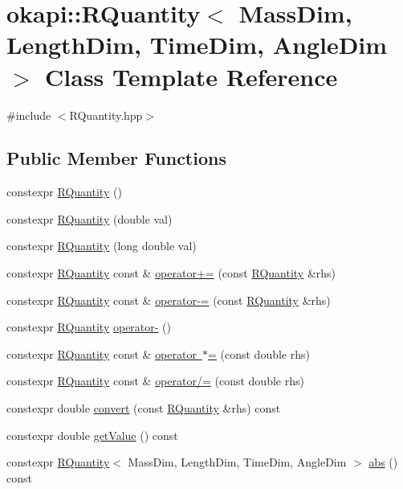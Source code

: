 \hypertarget{classokapi_1_1RQuantity}{}\section{okapi\+::R\+Quantity$<$ Mass\+Dim, Length\+Dim, Time\+Dim, Angle\+Dim $>$ Class Template Reference}
\label{classokapi_1_1RQuantity}


{\ttfamily \#include $<$R\+Quantity.\+hpp$>$}

\subsection*{Public Member Functions}
\begin{DoxyCompactItemize}
\item 
constexpr \mbox{\hyperlink{classokapi_1_1RQuantity_a0918777214e52b7ccb7fed21a822cdbe}{R\+Quantity}} ()
\item 
constexpr \mbox{\hyperlink{classokapi_1_1RQuantity_a94a20b6b52e5c85698de4fdd0a2b5336}{R\+Quantity}} (double val)
\item 
constexpr \mbox{\hyperlink{classokapi_1_1RQuantity_ab9101b75104aaa2a367781b4b0160c50}{R\+Quantity}} (long double val)
\item 
constexpr \mbox{\hyperlink{classokapi_1_1RQuantity}{R\+Quantity}} const  \& \mbox{\hyperlink{classokapi_1_1RQuantity_a788b594f6f9050612d781357bcfe745c}{operator+=}} (const \mbox{\hyperlink{classokapi_1_1RQuantity}{R\+Quantity}} \&rhs)
\item 
constexpr \mbox{\hyperlink{classokapi_1_1RQuantity}{R\+Quantity}} const  \& \mbox{\hyperlink{classokapi_1_1RQuantity_a1b0ae4c9b6c2b6cd47904874ea3ea01c}{operator-\/=}} (const \mbox{\hyperlink{classokapi_1_1RQuantity}{R\+Quantity}} \&rhs)
\item 
constexpr \mbox{\hyperlink{classokapi_1_1RQuantity}{R\+Quantity}} \mbox{\hyperlink{classokapi_1_1RQuantity_a245f7d6d3400a4776604315baa0a3d88}{operator-\/}} ()
\item 
constexpr \mbox{\hyperlink{classokapi_1_1RQuantity}{R\+Quantity}} const  \& \mbox{\hyperlink{classokapi_1_1RQuantity_a6b7d24bc8921f4b139f3ecaa239099a5}{operator $\ast$=}} (const double rhs)
\item 
constexpr \mbox{\hyperlink{classokapi_1_1RQuantity}{R\+Quantity}} const  \& \mbox{\hyperlink{classokapi_1_1RQuantity_ae44a8f9c790bb637ab4c98af87b94db7}{operator/=}} (const double rhs)
\item 
constexpr double \mbox{\hyperlink{classokapi_1_1RQuantity_a95fa648c9647728389cc4180c8312cc1}{convert}} (const \mbox{\hyperlink{classokapi_1_1RQuantity}{R\+Quantity}} \&rhs) const
\item 
constexpr double \mbox{\hyperlink{classokapi_1_1RQuantity_ab3938e34d6e56f0b3352c777832e7cbe}{get\+Value}} () const
\item 
constexpr \mbox{\hyperlink{classokapi_1_1RQuantity}{R\+Quantity}}$<$ Mass\+Dim, Length\+Dim, Time\+Dim, Angle\+Dim $>$ \mbox{\hyperlink{classokapi_1_1RQuantity_a6c2615772058175dec0223d662c04b29}{abs}} () const
\end{DoxyCompactItemize}


